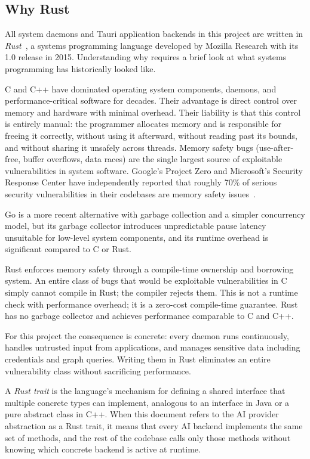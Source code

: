 \subsection{Why Rust}
\label{sec:rust-intro}

All system daemons and Tauri application backends in this project are written in
\emph{Rust}~\cite{rust-lang}, a systems programming language developed by
Mozilla Research with its 1.0 release in 2015. Understanding why requires a
brief look at what systems programming has historically looked like.

C and C++ have dominated operating system components, daemons, and
performance-critical software for decades. Their advantage is direct control
over memory and hardware with minimal overhead. Their liability is that this
control is entirely manual: the programmer allocates memory and is responsible
for freeing it correctly, without using it afterward, without reading past its
bounds, and without sharing it unsafely across threads. Memory safety bugs
(use-after-free, buffer overflows, data races) are the single largest source
of exploitable vulnerabilities in system software. Google's Project Zero and
Microsoft's Security Response Center have independently reported that roughly
70\% of serious security vulnerabilities in their codebases are memory safety
issues~\cite{msrc2019memory,google:projectzero2020}.

Go is a more recent alternative with garbage collection and a simpler
concurrency model, but its garbage collector introduces unpredictable pause
latency unsuitable for low-level system components, and its runtime overhead is
significant compared to C or Rust.

Rust enforces memory safety through a compile-time ownership and borrowing
system. An entire class of bugs that would be exploitable vulnerabilities in C
simply cannot compile in Rust; the compiler rejects them. This is not a
runtime check with performance overhead; it is a zero-cost compile-time
guarantee. Rust has no garbage collector and achieves performance comparable to
C and C++.

For this project the consequence is concrete: every daemon runs continuously,
handles untrusted input from applications, and manages sensitive data including
credentials and graph queries. Writing them in Rust eliminates an entire
vulnerability class without sacrificing performance.

A \emph{Rust trait} is the language's mechanism for defining a shared interface
that multiple concrete types can implement, analogous to an interface in Java
or a pure abstract class in C++. When this document refers to the AI provider
abstraction as a Rust trait, it means that every AI backend implements the same
set of methods, and the rest of the codebase calls only those methods without
knowing which concrete backend is active at runtime.

